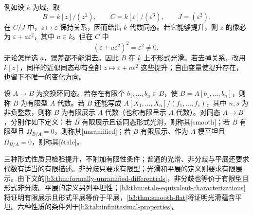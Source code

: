 \ProseParagraphBreak
例如设 \(k\) 为域，取
\[
	B=k[z]/(z^2),\qquad C=k[\varepsilon]/(\varepsilon^3), \qquad J=(\varepsilon^2).
\]
在 \(C/J\) 中，\(z\mapsto\varepsilon\) 保持关系，因而给出 \(k\) 代数同态。若它能够提升，则 \(z\) 的像必为 \(\varepsilon+a\varepsilon^2\)，其中 \(a\in k\)。但在 \(C\) 中
\[
	(\varepsilon+a\varepsilon^2)^2=\varepsilon^2\ne0,
\]
无论怎样选 \(a\)，误差都不能消去。因此 \(B\) 在 \(k\) 上不形式光滑。若去掉关系，改用 \(k[z]\)，同样的近似同态却有全部 \(z\mapsto\varepsilon+a\varepsilon^2\) 这些提升；自由变量使提升存在，也留下不唯一的变化方向。

\begin{definition}\label{b3:def:finite-presentation-infinitesimal-properties}
	设 \(A\to B\) 为交换环同态。若存在有限个 \(b_1,\ldots,b_n\in B\)，使 \(B=A[b_1,\ldots,b_n]\)，则称 \(B\) 为有限型 \(A\) 代数。若 \(B\) 还能写成 \(A[X_1,\ldots,X_n]/(f_1,\ldots,f_s)\)，其中 \(n,s\) 为非负整数，则称 \(B\) 为有限展示 \(A\) 代数（也称有限呈示 \(A\) 代数）。对同态 \(A\to B\)，分别作如下定义：若 \(B\) 有限展示且该同态形式光滑，则称其[smooth]；若 \(B\) 有限型且 \(\Omega_{B/A}=0\)，则称其[unramified]；若 \(B\) 有限展示、作为 \(A\) 模平坦且 \(\Omega_{B/A}=0\)，则称其[étale]。
\end{definition}

三种形式性质只检验提升，不附加有限性条件；普通的光滑、非分歧与平展还要求代数有适当的有限描述。非分歧只要求有限型；光滑和平展的定义则要求有限展示。由下文的\cref{b3:thm:formally-unramified-differentials}，非分歧也等价于有限型且形式非分歧。平展的定义另列平坦性；\cref{b3:thm:etale-equivalent-characterizations}将证明有限展示且形式平展等价于平展，\cref{b3:thm:smooth-flat}将证明光滑蕴含平坦。六种性质的条件列于\cref{b3:tab:infinitesimal-properties}。

